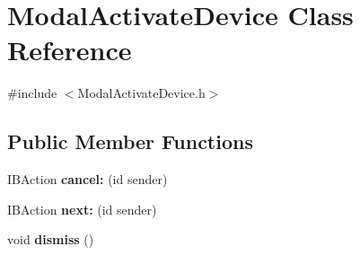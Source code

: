 \hypertarget{interface_modal_activate_device}{
\section{\-Modal\-Activate\-Device \-Class \-Reference}
\label{interface_modal_activate_device}
}


{\ttfamily \#include $<$\-Modal\-Activate\-Device.\-h$>$}

\subsection*{\-Public \-Member \-Functions}
\begin{DoxyCompactItemize}
\item 
\hypertarget{interface_modal_activate_device_aa6a7dcf6e0b7b5464b1462e3bd6d689f}{
\-I\-B\-Action {\bfseries cancel\-:} (id sender)}
\label{interface_modal_activate_device_aa6a7dcf6e0b7b5464b1462e3bd6d689f}

\item 
\hypertarget{interface_modal_activate_device_a881ebe114bb256df2fab429ffab1f8f5}{
\-I\-B\-Action {\bfseries next\-:} (id sender)}
\label{interface_modal_activate_device_a881ebe114bb256df2fab429ffab1f8f5}

\item 
\hypertarget{interface_modal_activate_device_a4b940ae1ba76f0a7e8855e723da1c9c6}{
void {\bfseries dismiss} ()}
\label{interface_modal_activate_device_a4b940ae1ba76f0a7e8855e723da1c9c6}

\end{DoxyCompactItemize}
